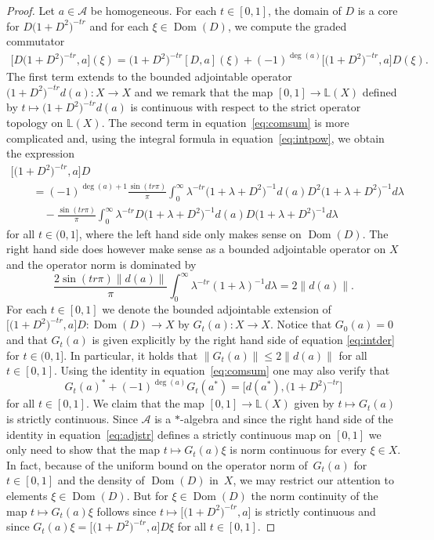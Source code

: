 \documentclass[11pt]{article}
\numberwithin{equation}{section}
\newcommand{\la}{\lambda}
\newcommand{\s}[1]{\mathscr{#1}}
\newcommand{\B}[1]{\mathbb{#1}}
\begin{document}
\begin{proof}
Let $a \in \s A$ be homogeneous. For each $t \in [0,1]$, the domain of $D$ is a core for $D\big(1 + D^2\big)^{-tr}$ and for each $\xi \in \operatorname{Dom}(D)$, we compute the graded commutator
\begin{gather}\label{eq:comsum}
\big[ D \big(1 + D^2\big)^{- tr} , a \big](\xi) = \big(1 + D^2\big)^{-tr} [D,a] (\xi) + (-1)^{\deg (a)}\big[ \big(1 + D^2\big)^{-tr},a\big] D(\xi) .
\end{gather}
The first term extends to the bounded adjointable operator $\big(1 + D^2\big)^{-tr} d(a)\colon X \to X$ and we remark that the map $[0,1] \to \B L(X)$ defined by $t \mapsto \big(1 + D^2\big)^{-tr} d(a)$ is continuous with respect to the strict operator topology on $\B L(X)$. The second term in equation~\eqref{eq:comsum} is more complicated and, using the integral formula in equation~\eqref{eq:intpow}, we obtain the expression
\begin{gather}
\big[ \big(1 + D^2\big)^{-tr},a\big] D \nonumber\\
\qquad{} = (-1)^{\deg (a) + 1} \frac{\sin(tr \pi)}{\pi} \int_0^\infty \la^{-tr} \big(1 + \la + D^2\big)^{-1} d(a) D^2 \big(1 + \la + D^2\big)^{-1} d\la \nonumber\\
\qquad\quad{} - \frac{\sin(tr \pi)}{\pi} \int_0^\infty \la^{-tr} D \big(1 + \la + D^2\big)^{-1} d(a) D \big(1 + \la + D^2\big)^{-1} d\la\label{eq:intder}
\end{gather}
for all $t \in (0,1]$, where the left hand side only makes sense on $\operatorname{Dom}(D)$. The right hand side does however make sense as a bounded adjointable operator on $X$ and the operator norm is dominated by
\[
\frac{2 \sin(tr \pi) \| d(a) \| }{\pi} \int_0^\infty \la^{-tr} (1 + \la)^{-1} d\la = 2 \| d(a) \| .
\]
For each $t \in [0,1]$ we denote the bounded adjointable extension of $\big[\big(1 + D^2\big)^{-tr},a\big] D\colon \operatorname{Dom}(D) \allowbreak \to X$ by $G_t(a)\colon X \to X$. Notice that $G_0(a) = 0$ and that $G_t(a)$ is given explicitly by the right hand side of equation \eqref{eq:intder} for $t \in (0,1]$. In particular, it holds that $\| G_t(a) \| \leq 2 \| d(a) \|$ for all $t \in [0,1]$. Using the identity in equation~\eqref{eq:comsum} one may also verify that
\begin{equation}\label{eq:adjstr}
G_t(a)^* + (-1)^{\deg (a)}G_t(a^*) = \big[ d(a^*), \big(1 + D^2\big)^{-tr} \big]
\end{equation}
for all $t \in [0,1]$. We claim that the map $[0,1] \to \B L(X)$ given by $t \mapsto G_t(a)$ is strictly continuous. Since $\s A$ is a $*$-algebra and since the right hand side of the identity in equation~\eqref{eq:adjstr} defines a strictly continuous map on $[0,1]$ we only need to show that the map $t \mapsto G_t(a) \xi$ is norm continuous for every $\xi \in X$. In fact, because of the uniform bound on the operator norm of~$G_t(a)$ for $t \in [0,1]$ and the density of $\operatorname{Dom}(D)$ in~$X$, we may restrict our attention to elements $\xi \in \operatorname{Dom}(D)$. But for $\xi \in \operatorname{Dom}(D)$ the norm continuity of the map $t \mapsto G_t(a) \xi$ follows since $t \mapsto \big[ \big(1 + D^2\big)^{-tr}, a\big]$ is strictly continuous and since $G_t(a) \xi = \big[ \big(1 + D^2\big)^{-tr},a\big] D \xi$ for all $t \in [0,1]$.


\end{proof}
\end{document}
